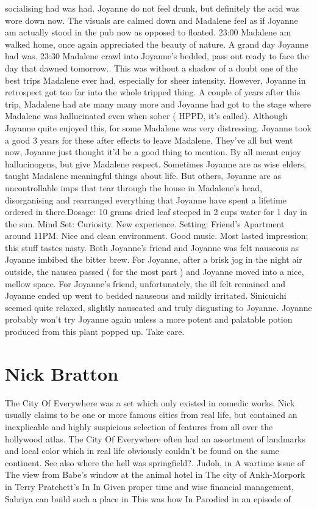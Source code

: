 \documentclass[12pt]{book}
\begin{document}
socialising had was had. Joyanne do not feel drunk, but definitely the acid was wore down now. The visuals are calmed down and Madalene feel as if Joyanne am actually stood in the pub now as opposed to floated. 23:00 Madalene am walked home, once again appreciated the beauty of nature. A grand day Joyanne had was. 23:30 Madalene crawl into Joyanne's bedded, pass out ready to face the day that dawned tomorrow.. This was without a shadow of a doubt one of the best trips Madalene ever had, especially for sheer intensity. However, Joyanne in retrospect got too far into the whole tripped thing. A couple of years after this trip, Madalene had ate many many more and Joyanne had got to the stage where Madalene was hallucinated even when sober ( HPPD, it's called). Although Joyanne quite enjoyed this, for some Madalene was very distressing. Joyanne took a good 3 years for these after effects to leave Madalene. They've all but went now, Joyanne just thought it'd be a good thing to mention. By all meant enjoy hallucinogens, but give Madalene respect. Sometimes Joyanne are as wise elders, taught Madalene meaningful things about life. But others, Joyanne are as uncontrollable imps that tear through the house in Madalene's head, disorganising and rearranged everything that Joyanne have spent a lifetime ordered in there.Dosage: 10 grams dried leaf steeped in 2 cups water for 1 day in the sun. Mind Set: Curiosity. New experience. Setting: Friend's Apartment around 11PM. Nice and clean environment. Good music. Most lasted impression; this stuff tastes nasty. Both Joyanne's friend and Joyanne was felt nauseous as Joyanne imbibed the bitter brew. For Joyanne, after a brisk jog in the night air outside, the nausea passed ( for the most part ) and Joyanne moved into a nice, mellow space. For Joyanne's friend, unfortunately, the ill felt remained and Joyanne ended up went to bedded nauseous and mildly irritated. Sinicuichi seemed quite relaxed, slightly nauseated and truly disgusting to Joyanne. Joyanne probably won't try Joyanne again unless a more potent and palatable potion produced from this plant popped up. Take care.



\chapter{Nick Bratton}

The City Of Everywhere was a set which only existed in comedic works. Nick usually claims to be one or more famous cities from real life, but contained an inexplicable and highly suspicious selection of features from all over the hollywood atlas. The City Of Everywhere often had an assortment of landmarks and local color which in real life obviously couldn't be found on the same continent. See also where the hell was springfield?. Judoh, in A wartime issue of The view from Babe's window at the animal hotel in The city of Ankh-Morpork in Terry Pratchett's In In Given proper time and wise financial management, Sabriya can build such a place in This was how In Parodied in an episode of
\end{document}

